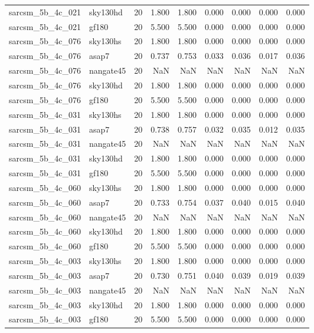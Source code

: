 \begin{tabular}{llrrrrrrr}
sarcsm\_5b\_4c\_021 & sky130hd & 20 & 1.800 & 1.800 & 0.000 & 0.000 & 0.000 & 0.000 \\
sarcsm\_5b\_4c\_021 & gf180 & 20 & 5.500 & 5.500 & 0.000 & 0.000 & 0.000 & 0.000 \\
sarcsm\_5b\_4c\_076 & sky130hs & 20 & 1.800 & 1.800 & 0.000 & 0.000 & 0.000 & 0.000 \\
sarcsm\_5b\_4c\_076 & asap7 & 20 & 0.737 & 0.753 & 0.033 & 0.036 & 0.017 & 0.036 \\
sarcsm\_5b\_4c\_076 & nangate45 & 20 & NaN & NaN & NaN & NaN & NaN & NaN \\
sarcsm\_5b\_4c\_076 & sky130hd & 20 & 1.800 & 1.800 & 0.000 & 0.000 & 0.000 & 0.000 \\
sarcsm\_5b\_4c\_076 & gf180 & 20 & 5.500 & 5.500 & 0.000 & 0.000 & 0.000 & 0.000 \\
sarcsm\_5b\_4c\_031 & sky130hs & 20 & 1.800 & 1.800 & 0.000 & 0.000 & 0.000 & 0.000 \\
sarcsm\_5b\_4c\_031 & asap7 & 20 & 0.738 & 0.757 & 0.032 & 0.035 & 0.012 & 0.035 \\
sarcsm\_5b\_4c\_031 & nangate45 & 20 & NaN & NaN & NaN & NaN & NaN & NaN \\
sarcsm\_5b\_4c\_031 & sky130hd & 20 & 1.800 & 1.800 & 0.000 & 0.000 & 0.000 & 0.000 \\
sarcsm\_5b\_4c\_031 & gf180 & 20 & 5.500 & 5.500 & 0.000 & 0.000 & 0.000 & 0.000 \\
sarcsm\_5b\_4c\_060 & sky130hs & 20 & 1.800 & 1.800 & 0.000 & 0.000 & 0.000 & 0.000 \\
sarcsm\_5b\_4c\_060 & asap7 & 20 & 0.733 & 0.754 & 0.037 & 0.040 & 0.015 & 0.040 \\
sarcsm\_5b\_4c\_060 & nangate45 & 20 & NaN & NaN & NaN & NaN & NaN & NaN \\
sarcsm\_5b\_4c\_060 & sky130hd & 20 & 1.800 & 1.800 & 0.000 & 0.000 & 0.000 & 0.000 \\
sarcsm\_5b\_4c\_060 & gf180 & 20 & 5.500 & 5.500 & 0.000 & 0.000 & 0.000 & 0.000 \\
sarcsm\_5b\_4c\_003 & sky130hs & 20 & 1.800 & 1.800 & 0.000 & 0.000 & 0.000 & 0.000 \\
sarcsm\_5b\_4c\_003 & asap7 & 20 & 0.730 & 0.751 & 0.040 & 0.039 & 0.019 & 0.039 \\
sarcsm\_5b\_4c\_003 & nangate45 & 20 & NaN & NaN & NaN & NaN & NaN & NaN \\
sarcsm\_5b\_4c\_003 & sky130hd & 20 & 1.800 & 1.800 & 0.000 & 0.000 & 0.000 & 0.000 \\
sarcsm\_5b\_4c\_003 & gf180 & 20 & 5.500 & 5.500 & 0.000 & 0.000 & 0.000 & 0.000 \\

\end{tabular}
